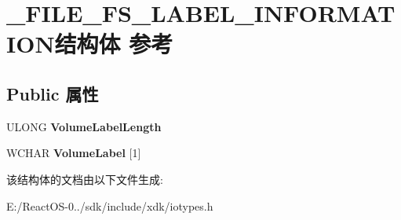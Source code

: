 \hypertarget{struct___f_i_l_e___f_s___l_a_b_e_l___i_n_f_o_r_m_a_t_i_o_n}{}\section{\+\_\+\+F\+I\+L\+E\+\_\+\+F\+S\+\_\+\+L\+A\+B\+E\+L\+\_\+\+I\+N\+F\+O\+R\+M\+A\+T\+I\+O\+N结构体 参考}
\label{struct___f_i_l_e___f_s___l_a_b_e_l___i_n_f_o_r_m_a_t_i_o_n}
\subsection*{Public 属性}
\begin{DoxyCompactItemize}
\item 
\mbox{\label{struct___f_i_l_e___f_s___l_a_b_e_l___i_n_f_o_r_m_a_t_i_o_n_a29bb54ce882d82c22b42dd077284bcdf}} 
U\+L\+O\+NG {\bfseries Volume\+Label\+Length}
\item 
\mbox{\label{struct___f_i_l_e___f_s___l_a_b_e_l___i_n_f_o_r_m_a_t_i_o_n_abfdc16fd582567b26b419949132fa3c9}} 
W\+C\+H\+AR {\bfseries Volume\+Label} \mbox{[}1\mbox{]}
\end{DoxyCompactItemize}


该结构体的文档由以下文件生成\+:\begin{DoxyCompactItemize}
\item 
E\+:/\+React\+O\+S-\/0../sdk/include/xdk/iotypes.\+h\end{DoxyCompactItemize}
